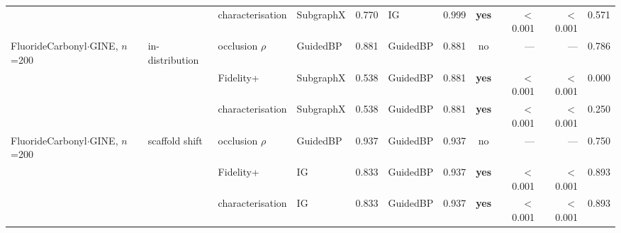 \begin{table}[t]
{\begin{tabular}{llllrlrcrrr}
 &  & characterisation & SubgraphX & 0.770 & IG & 0.999 & \textbf{yes} & $<$0.001 & $<$0.001 & 0.571 \\
\addlinespace[2pt]
FluorideCarbonyl$\cdot$GINE, $n$=200 & in-distribution & occlusion $\rho$ & GuidedBP & 0.881 & GuidedBP & 0.881 & no & --- & --- & 0.786 \\
 &  & Fidelity+ & SubgraphX & 0.538 & GuidedBP & 0.881 & \textbf{yes} & $<$0.001 & $<$0.001 & 0.000 \\
 &  & characterisation & SubgraphX & 0.538 & GuidedBP & 0.881 & \textbf{yes} & $<$0.001 & $<$0.001 & 0.250 \\
\addlinespace[2pt]
FluorideCarbonyl$\cdot$GINE, $n$=200 & scaffold shift & occlusion $\rho$ & GuidedBP & 0.937 & GuidedBP & 0.937 & no & --- & --- & 0.750 \\
 &  & Fidelity+ & IG & 0.833 & GuidedBP & 0.937 & \textbf{yes} & $<$0.001 & $<$0.001 & 0.893 \\
 &  & characterisation & IG & 0.833 & GuidedBP & 0.937 & \textbf{yes} & $<$0.001 & $<$0.001 & 0.893 \\
\bottomrule
\end{tabular}}
\end{table}
